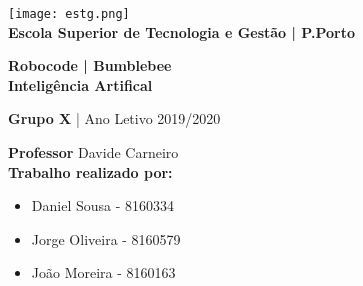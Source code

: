 \begin{titlepage}

\center

\texttt{[image: estg.png]}\\[1cm]
\textbf{Escola Superior de Tecnologia e Gestão | P.Porto}\\[0.5cm]

\vfill

\linespread{1.2}\huge {\bfseries Robocode | Bumblebee}\\[0.5cm]
\large{\textbf{Inteligência Artifical}}

\normalsize{\textbf{Grupo X} | Ano Letivo 2019/2020}

\vfill

\endcenter

\begin{flushleft}

\textbf{Professor} Davide Carneiro\\[0.65cm]

\textbf{\small Trabalho realizado por:}\\[0cm]

\begin{itemize}
	\item{\small Daniel Sousa - 8160334}\\[0cm]
	\item{\small Jorge Oliveira - 8160579}\\[0cm]
	\item{\small João Moreira - 8160163}

\end{itemize}

\end{flushleft}

\end{titlepage}
